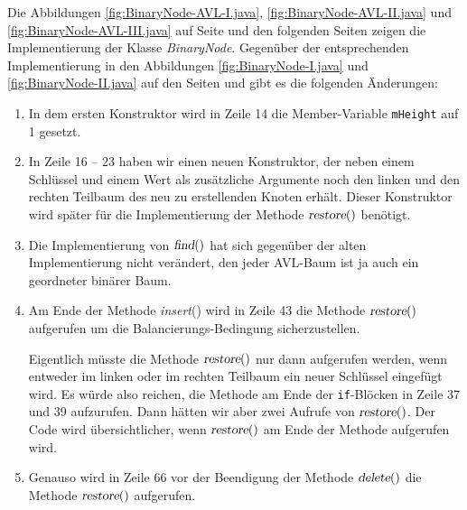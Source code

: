 Die Abbildungen \ref{fig:BinaryNode-AVL-I.java}, \ref{fig:BinaryNode-AVL-II.java} und
\ref{fig:BinaryNode-AVL-III.java} auf Seite \pageref{fig:BinaryNode-AVL-I.java}
und den folgenden Seiten zeigen die Implementierung der Klasse \textsl{BinaryNode}.
Gegen\"uber der entsprechenden Implementierung in den Abbildungen
\ref{fig:BinaryNode-I.java} und \ref{fig:BinaryNode-II.java} 
auf den Seiten \pageref{fig:BinaryNode-I.java} und \pageref{fig:BinaryNode-II.java} 
gibt es die folgenden \"Anderungen:
\begin{enumerate}
\item In dem ersten Konstruktor wird in Zeile 14 die Member-Variable \texttt{mHeight} auf
      1 gesetzt.
\item In Zeile 16 -- 23 haben wir einen neuen Konstruktor,
      der neben einem Schl\"ussel und einem Wert als zus\"atzliche Argumente noch den
      linken und den rechten Teilbaum des neu zu erstellenden Knoten erh\"alt.
      Dieser Konstruktor wird sp\"ater f\"ur die Implementierung der Methode $\textsl{restore}()$
      ben\"otigt.
\item Die Implementierung von $\textsl{find}()$ hat sich gegen\"uber der alten Implementierung 
      nicht ver\"andert, den jeder AVL-Baum ist ja auch ein geordneter bin\"arer Baum.
\item Am Ende der Methode \textsl{insert}() wird in Zeile 43 die Methode
      $\textsl{restore}()$ aufgerufen um die Balancierungs-Bedingung sicherzustellen. 

      Eigentlich m\"usste die Methode $\textsl{restore}()$ nur dann aufgerufen werden,
      wenn entweder im linken oder im rechten Teilbaum ein neuer Schl\"ussel eingef\"ugt wird.  Es w\"urde also
      reichen, die Methode am Ende der  \texttt{if}-Bl\"ocken in Zeile 37 und 39 aufzurufen.
      Dann h\"atten wir aber zwei Aufrufe von $\textsl{restore}()$.  Der Code wird 
      \"ubersichtlicher, wenn $\textsl{restore}()$ am Ende der Methode aufgerufen wird.
\item Genauso wird in Zeile 66 vor der Beendigung der Methode $\textsl{delete}()$
      die Methode $\textsl{restore}()$ aufgerufen.


\end{enumerate}
